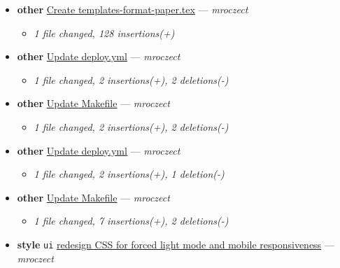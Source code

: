 \begin{itemize}[leftmargin=1.5em]
  \begin{itemize}[leftmargin=1.5em]
    \item \small\textit{1 file changed, 128 deletions(-)}
  \end{itemize}
  \item \textbf{other} \href{https://github.com/mroczect/mroczect.github.io/commit/acbf14bbceb9d831cec1d829276e4d621a17074c}{Create templates-format-paper.tex} --- \textit{mroczect}
  \begin{itemize}[leftmargin=1.5em]
    \item \small\textit{1 file changed, 128 insertions(+)}
  \end{itemize}
  \item \textbf{other} \href{https://github.com/mroczect/mroczect.github.io/commit/f57ef812d65b6e74343e197bd4f8a4b3057288fd}{Update deploy.yml} --- \textit{mroczect}
  \begin{itemize}[leftmargin=1.5em]
    \item \small\textit{1 file changed, 2 insertions(+), 2 deletions(-)}
  \end{itemize}
  \item \textbf{other} \href{https://github.com/mroczect/mroczect.github.io/commit/763cf5b60a4255d4f21a5dbb7c105d44e445863a}{Update Makefile} --- \textit{mroczect}
  \begin{itemize}[leftmargin=1.5em]
    \item \small\textit{1 file changed, 2 insertions(+), 2 deletions(-)}
  \end{itemize}
  \item \textbf{other} \href{https://github.com/mroczect/mroczect.github.io/commit/d72754c298efe059ce9fa0acafee4aa768cedbe9}{Update deploy.yml} --- \textit{mroczect}
  \begin{itemize}[leftmargin=1.5em]
    \item \small\textit{1 file changed, 2 insertions(+), 1 deletion(-)}
  \end{itemize}
  \item \textbf{other} \href{https://github.com/mroczect/mroczect.github.io/commit/15b807c1da7387bec37a397c039ee757d4ebdffb}{Update Makefile} --- \textit{mroczect}
  \begin{itemize}[leftmargin=1.5em]
    \item \small\textit{1 file changed, 7 insertions(+), 2 deletions(-)}
  \end{itemize}
  \item \textbf{style} \texttt{ui} \href{https://github.com/mroczect/mroczect.github.io/commit/69ba05f4bb91048e6071fa6a30b8e3d6eeebd21d}{redesign CSS for forced light mode and mobile responsiveness} --- \textit{mroczect}

\end{itemize}
